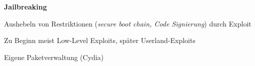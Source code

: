 \begin{frame}
	\centering
	\textbf{Jailbreaking}
	\begin{block}{}
		Aushebeln von Restriktionen (\textsl{secure boot chain, Code Signierung})
		durch Exploit
	\end{block}
	\begin{block}{}
		 Zu Beginn meist Low-Level Exploits, später Userland-Exploits
	\end{block}
	\begin{block}{}
		Eigene Paketverwaltung (Cydia)
	\end{block}

\end{frame}